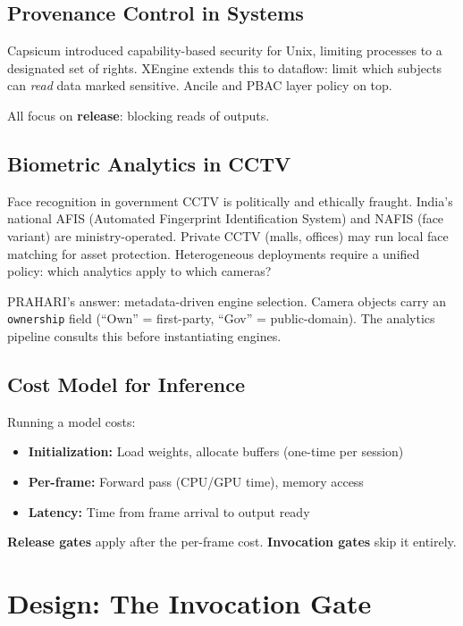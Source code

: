 \documentclass[sigplan,review]{acmart}
\begin{document}
\subsection{Provenance Control in Systems}

Capsicum \cite{capsicum2010} introduced capability-based security for Unix, limiting processes to
a designated set of rights. XEngine \cite{xengine} extends this to dataflow: limit which subjects
can \emph{read} data marked sensitive. Ancile \cite{ancile} and PBAC \cite{pbac} layer policy on top.

All focus on \textbf{release}: blocking reads of outputs.

\subsection{Biometric Analytics in CCTV}

Face recognition in government CCTV is politically and ethically fraught. India's national AFIS
(Automated Fingerprint Identification System) and NAFIS (face variant) are ministry-operated.
Private CCTV (malls, offices) may run local face matching for asset protection. Heterogeneous
deployments require a unified policy: which analytics apply to which cameras?

PRAHARI's answer: metadata-driven engine selection. Camera objects carry an \texttt{ownership}
field (``Own'' = first-party, ``Gov'' = public-domain). The analytics pipeline consults this
before instantiating engines.

\subsection{Cost Model for Inference}

Running a model costs:
\begin{itemize}
  \item \textbf{Initialization:} Load weights, allocate buffers (one-time per session)
  \item \textbf{Per-frame:} Forward pass (CPU/GPU time), memory access
  \item \textbf{Latency:} Time from frame arrival to output ready
\end{itemize}

\textbf{Release gates} apply after the per-frame cost. \textbf{Invocation gates} skip it entirely.

\section{Design: The Invocation Gate}
\end{document}
